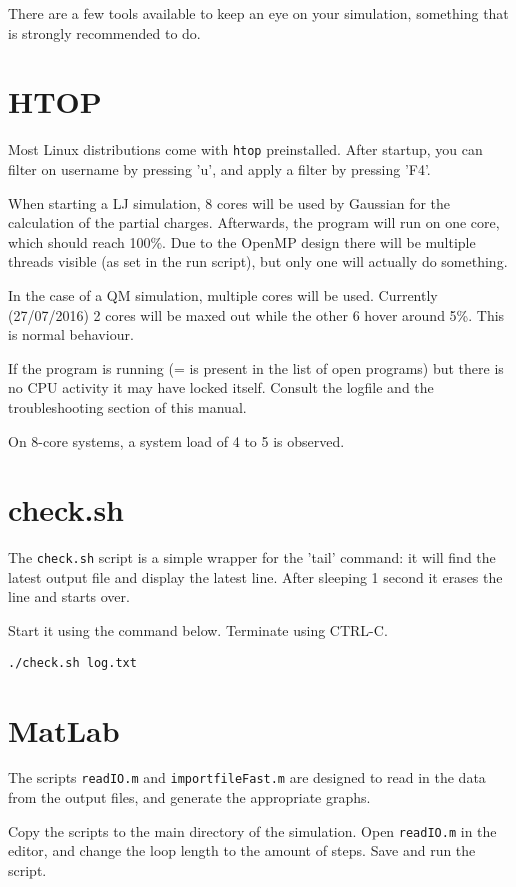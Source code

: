 
There are a few tools available to keep an eye on your simulation, something 
that is strongly recommended to do.


\section{HTOP}
Most Linux distributions come with \verb|htop| preinstalled. After startup, you 
can filter on username by pressing 'u', and apply a filter by pressing 'F4'. 

When starting a LJ simulation, 8 cores will be used by Gaussian for the 
calculation of the partial charges. Afterwards, the program will run on one 
core, which should reach 100\%. Due to the OpenMP design there will be multiple 
threads visible (as set in the run script), but only one will actually do 
something.

In the case of a QM simulation, multiple cores will be used. Currently 
(27/07/2016) 2 cores will be maxed out while the other 6 hover around 5\%. This 
is normal behaviour.

If the program is running (= is present in the list of open programs) but there 
is no CPU activity it may have locked itself. Consult the logfile and the 
troubleshooting section of this manual.

On 8-core systems, a system load of 4 to 5 is observed.

\section{check.sh}
The \verb|check.sh| script is a simple wrapper for the 'tail' command: it will 
find the latest output file and display the latest line. After sleeping 1 
second it erases the line and starts over.

Start it using the command below. Terminate using CTRL-C.
\begin{lstlisting}[caption=The check utility]
./check.sh log.txt
\end{lstlisting}

\section{MatLab}
The scripts \verb|readIO.m| and \verb|importfileFast.m| are designed to read in 
the data from the output files, and generate the appropriate graphs.

Copy the scripts to the main directory of the simulation. Open \verb|readIO.m| 
in the editor, and change the loop length to the amount of steps. Save and run 
the script.

